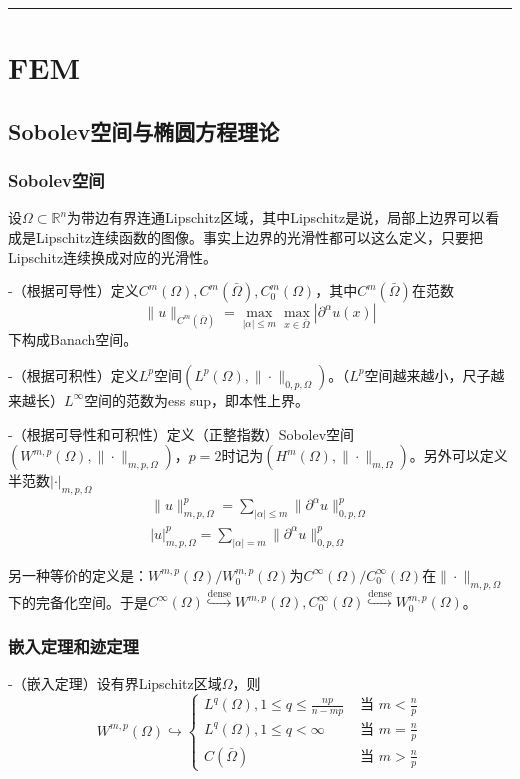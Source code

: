 \vspace{5pt} \hrule \vspace{5pt}

\chapter{FEM}
\section{Sobolev空间与椭圆方程理论}

\subsection{Sobolev空间}
设$\Omega \subset \mathbb{R}^n$为带边有界连通Lipschitz区域，其中Lipschitz是说，局部上边界可以看成是Lipschitz连续函数的图像。事实上边界的光滑性都可以这么定义，只要把Lipschitz连续换成对应的光滑性。

-（根据可导性）定义$C^m(\Omega), C^m(\bar{\Omega}), C_0^m(\Omega)$，其中$C^m(\bar{\Omega})$在范数
\[
  \|u\|_{C^m(\bar{\Omega})} = \max_{|\alpha| \le m} \max_{x \in \bar{\Omega}} |\partial^\alpha u(x)|
\]
下构成Banach空间。

-（根据可积性）定义$L^p$空间$(L^p(\Omega), \|\cdot\|_{0, p, \Omega})$。（$L^p$空间越来越小，尺子越来越长）$L^\infty$空间的范数为ess sup，即本性上界。

-（根据可导性和可积性）定义（正整指数）Sobolev空间$(W^{m, p}(\Omega), \|\cdot\|_{m, p, \Omega})$，$p = 2$时记为$(H^m(\Omega), \|\cdot\|_{m, \Omega})$。另外可以定义半范数$|\cdot|_{m, p, \Omega}$
\[
  \begin{aligned}
    \|u\|_{m, p, \Omega}^p = \sum_{|\alpha| \le m} \|\partial^\alpha u\|_{0, p, \Omega}^p\\
    |u|_{m, p, \Omega}^p = \sum_{|\alpha| = m} \|\partial^\alpha u\|_{0, p, \Omega}^p
  \end{aligned}
\]

另一种等价的定义是：$W^{m, p}(\Omega)/W^{m, p}_0(\Omega)$为$C^{\infty}(\Omega)/C^{\infty}_0(\Omega)$在$\|\cdot\|_{m, p, \Omega}$下的完备化空间。于是$C^{\infty}(\Omega) \overset{\text{dense}}{\hookrightarrow} W^{m, p}(\Omega), C^{\infty}_0(\Omega)\overset{\text{dense}}{\hookrightarrow} W^{m, p}_0(\Omega)$。

\subsection{嵌入定理和迹定理}

-（嵌入定理）设有界Lipschitz区域$\Omega$，则
\[
  W^{m, p}(\Omega) \hookrightarrow\left\{\begin{array}{ll}
    L^{q}(\Omega), 1 \le q \le \frac{n p}{n-m p} & \text { 当 } m<\frac{n}{p} \\
    L^{q}(\Omega), 1 \le q<\infty & \text { 当 } m=\frac{n}{p} \\
    C(\bar{\Omega}) & \text { 当 } m>\frac{n}{p}
  \end{array}\right.
\]

